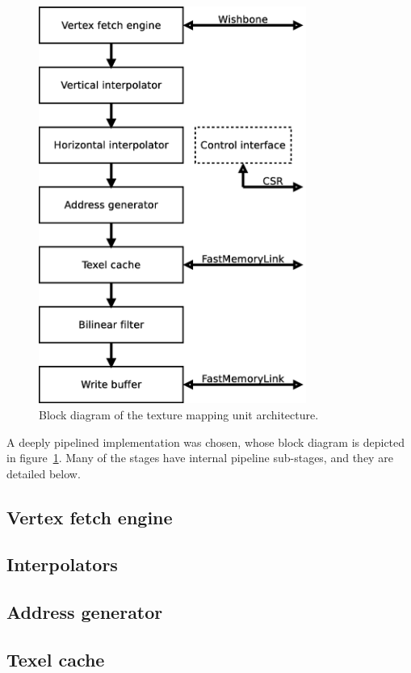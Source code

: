 \documentclass[a4paper,11pt]{kthesis}
\begin{document}
\begin{figure}[htp]
\centering
\includegraphics[height=130mm]{tmublock.eps}
\caption{Block diagram of the texture mapping unit architecture.}
\label{fig:tmublock}
\end{figure}

A deeply pipelined implementation was chosen, whose block diagram is depicted in figure~\ref{fig:tmublock}. Many of the stages have internal pipeline sub-stages, and they are detailed below.

\subsection{Vertex fetch engine}

\subsection{Interpolators}

\subsection{Address generator}

\subsection{Texel cache}
\end{document}
